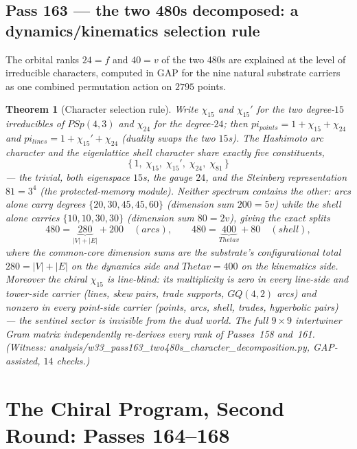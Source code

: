\documentclass[12pt,a4paper]{article}
\def\mathrm#1{#1}%
\def\texttt#1{#1}%
\def\text#1{#1}%
\def\pi{pi}%
\def\Theta{Theta}%
\newtheorem{theorem}{Theorem}[section]
\theoremstyle{definition}
\newcommand{\GQ}{\mathrm{GQ}}
\newcommand{\PSp}{\mathrm{PSp}}
\begin{document}
\subsection{Pass 163 --- the two 480s decomposed: a dynamics/kinematics
selection rule}
\label{ssec:pass163}

The orbital ranks $24=f$ and $40=v$ of the two 480s are explained at the
level of irreducible characters, computed in GAP for the nine natural
substrate carriers as one combined permutation action on $2795$ points.

\begin{theorem}[Character selection rule]
\label{thm:selection-rule}
Write $\chi_{15}$ and $\chi_{15}'$ for the two degree-$15$ irreducibles of
$\PSp(4,3)$ and $\chi_{24}$ for the degree-$24$; then
$\pi_{\mathrm{points}}=1+\chi_{15}+\chi_{24}$ and
$\pi_{\mathrm{lines}}=1+\chi_{15}'+\chi_{24}$ (duality swaps the two
$15$s). The Hashimoto arc character and the eigenlattice shell character
share exactly \emph{five} constituents,
\[
  \{\,1,\;\chi_{15},\;\chi_{15}',\;\chi_{24},\;\chi_{81}\,\}
\]
--- the trivial, both eigenspace $15$s, the gauge $24$, and the Steinberg
representation $81=3^4$ (the protected-memory module). Neither spectrum
contains the other: arcs alone carry degrees $\{20,30,45,45,60\}$
(dimension sum $200=5v$) while the shell alone carries
$\{10,10,30,30\}$ (dimension sum $80=2v$), giving the exact splits
\[
  480 = \underbrace{280}_{|V|+|E|} + 200
  \quad(\text{arcs}),
  \qquad
  480 = \underbrace{400}_{\Theta v} + 80
  \quad(\text{shell}),
\]
where the common-core dimension sums are the substrate's configurational
total $280=|V|+|E|$ on the dynamics side and $\Theta v=400$ on the
kinematics side. Moreover the chiral $\chi_{15}$ is \emph{line-blind}: its
multiplicity is zero in every line-side and tower-side carrier (lines, skew
pairs, trade supports, $\GQ(4,2)$ arcs) and nonzero in every point-side
carrier (points, arcs, shell, trades, hyperbolic pairs) --- the sentinel
sector is invisible from the dual world. The full $9\times9$ intertwiner
Gram matrix independently re-derives every rank of Passes~158 and~161.
(Witness:
\texttt{analysis/w33\_pass163\_two480s\_character\_decomposition.py},
GAP-assisted, $14$ checks.)
\end{theorem}

\section{The Chiral Program, Second Round: Passes 164--168}
\label{sec:chiral-program-two}
\end{document}
